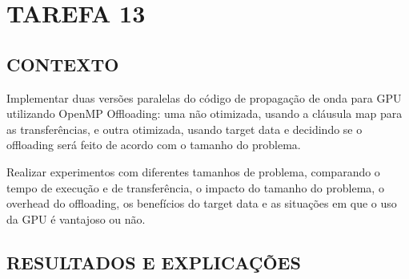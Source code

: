 \documentclass[12pt, openright, oneside, a4paper, brazil]{article}
\newcommand{\subtUm}{CONTEXTO}
\newcommand{\subtDois}{RESULTADOS E EXPLICAÇÕES}
\begin{document}
	\newpage
	\onehalfspacing
	\section{TAREFA 13}
	\subsection{\subtUm}
	\par{Implementar duas versões paralelas do código de propagação de onda para GPU utilizando OpenMP Offloading: uma não otimizada, usando a cláusula map para as transferências, e outra otimizada, usando target data e decidindo se o offloading será feito de acordo com o tamanho do problema.
		
		Realizar experimentos com diferentes tamanhos de problema, comparando o tempo de execução e de transferência, o impacto do tamanho do problema, o overhead do offloading, os benefícios do target data e as situações em que o uso da GPU é vantajoso ou não.}
	\subsection{\subtDois}
	
\end{document}
